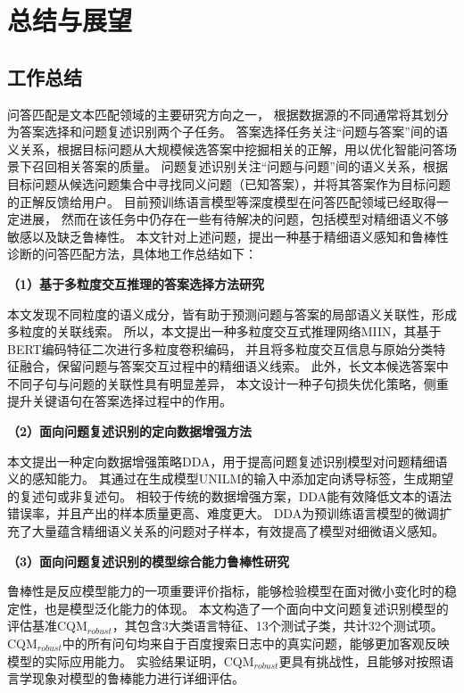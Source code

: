 \chapter{总结与展望}

\section{工作总结}

问答匹配是文本匹配领域的主要研究方向之一，
根据数据源的不同通常将其划分为答案选择和问题复述识别两个子任务。
答案选择任务关注“问题与答案”间的语义关系，根据目标问题从大规模候选答案中挖掘相关的正解，用以优化智能问答场景下召回相关答案的质量。
问题复述识别关注“问题与问题”间的语义关系，根据目标问题从候选问题集合中寻找同义问题（已知答案），并将其答案作为目标问题的正解反馈给用户。
目前预训练语言模型等深度模型在问答匹配领域已经取得一定进展，
然而在该任务中仍存在一些有待解决的问题，包括模型对精细语义不够敏感以及缺乏鲁棒性。
本文针对上述问题，提出一种基于精细语义感知和鲁棒性诊断的问答匹配方法，具体地工作总结如下：

\textbf{\songti （1）基于多粒度交互推理的答案选择方法研究}

本文发现不同粒度的语义成分，皆有助于预测问题与答案的局部语义关联性，形成多粒度的关联线索。
所以，本文提出一种多粒度交互式推理网络MIIN，其基于BERT编码特征二次进行多粒度卷积编码，
并且将多粒度交互信息与原始分类特征融合，保留问题与答案交互过程中的精细语义线索。
此外，长文本候选答案中不同子句与问题的关联性具有明显差异，
本文设计一种子句损失优化策略，侧重提升关键语句在答案选择过程中的作用。

\textbf{\songti （2）面向问题复述识别的定向数据增强方法}

本文提出一种定向数据增强策略DDA，用于提高问题复述识别模型对问题精细语义的感知能力。
其通过在生成模型UNILM的输入中添加定向诱导标签，生成期望的复述句或非复述句。
相较于传统的数据增强方案，DDA能有效降低文本的语法错误率，并且产出的样本质量更高、难度更大。
DDA为预训练语言模型的微调扩充了大量蕴含精细语义关系的问题对子样本，有效提高了模型对细微语义感知。

\textbf{\songti （3）面向问题复述识别的模型综合能力鲁棒性研究}

鲁棒性是反应模型能力的一项重要评价指标，能够检验模型在面对微小变化时的稳定性，也是模型泛化能力的体现。
本文构造了一个面向中文问题复述识别模型的评估基准CQM$_{robust}$，其包含3大类语言特征、13个测试子类，共计32个测试项。
CQM$_{robust}$中的所有问句均来自于百度搜索日志中的真实问题，能够更加客观反映模型的实际应用能力。
实验结果证明，CQM$_{robust}$更具有挑战性，且能够对按照语言学现象对模型的鲁棒能力进行详细评估。

